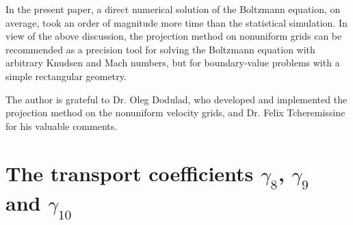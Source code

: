 \documentclass[]{jfm}
\begin{document}
In the present paper, a direct numerical solution of the Boltzmann equation, on average,
took an order of magnitude more time than the statistical simulation.
In view of the above discussion, the projection method on nonuniform grids can be recommended
as a precision tool for solving the Boltzmann equation with arbitrary Knudsen and Mach numbers,
but for boundary-value problems with a simple rectangular geometry.

\begin{acknowledgments}
    The author is grateful to Dr. Oleg Dodulad, who developed and implemented the projection method
    on the nonuniform velocity grids, and Dr. Felix Tcheremissine for his valuable comments.
\end{acknowledgments}

\appendix
\section{The transport coefficients \(\gamma_8\), \(\gamma_9\) and \(\gamma_{10}\)}
\label{sec:gamma_coeffs}
\end{document}
